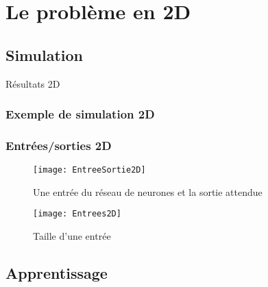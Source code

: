 

% 

\section{Le problème en 2D}

\subsection{Simulation}
\begin{frame}
    \large
    \centering
    Résultats 2D
\end{frame}

\begin{frame}[fragile]
    \frametitle{Exemple de simulation 2D}
  \begin{center}
  \end{center}
\end{frame}

\begin{frame}[fragile]
    \frametitle{Entrées/sorties 2D}

        \begin{figure}
        \texttt{[image: EntreeSortie2D]}       
        \caption{Une entrée du réseau de neurones et la sortie attendue}
        \end{figure}
        \begin{figure}
        \texttt{[image: Entrees2D]}       
        \caption{Taille d'une entrée}
        \end{figure}

\end{frame}

\subsection{Apprentissage}

